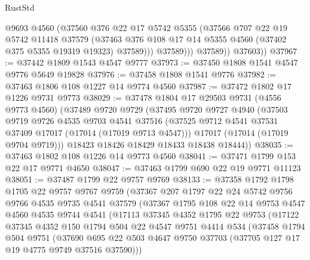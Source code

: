 \begin{lexlean}{RustStd}
\begin{coremodule}
                  @9693
                  @4560
                  (@37560
                    @376
                    @22
                    @17
                    @5742
                    @5355
                    (@37566
                      @707
                      @22
                      @19
                      @5742
                      @11418
                      @37579
                      (@37463
                        @376
                        @108
                        @17
                        @14
                        @5355
                        @4560
                        (@37402 @375 @5355 @19319 @19323)
                        @37589)))
                  @37589)))
            @37589))
        @37603))
@37967 := @37442 @1809 @1543 @4547 @9777
@37973 := @37450 @1808 @1541 @4547 @9776 @5649 @19828
@37976 := @37458 @1808 @1541 @9776
@37982 := @37463 @1806 @108 @1227 @14 @9774 @4560
@37987 := @37472 @1802 @17 @1226 @9731 @9773
@38029 := @37478
    @1804
    @17
    @29503
    @9731
    (@4556 @9773 @4560)
    (@37489
      @9720
      @9729
      (@37495
        @9720
        @9727
        @4940
        (@37503
          @9719
          @9726
          @4535
          @9703
          @4541
          @37516
          (@37525 @9712 @4541 @37531 @37409 @17017 (@17014 (@17019 @9713 @4547)))
          @17017
          (@17014 (@17019 @9704 @9719)))
        @18423
        @18426
        @18429
        @18433
        @18438
        @18444))
@38035 := @37463 @1802 @108 @1226 @14 @9773 @4560
@38041 := @37471 @1799 @153 @22 @17 @9771 @4650
@38047 := @37463 @1799 @690 @22 @19 @9771 @11123
@38051 := @37487 @1799 @22 @9757 @9769
@38133 := @37358
    @1792
    @1798
    @1705
    @22
    @9757
    @9767
    @9759
    (@37367
      @207
      @1797
      @22
      @24
      @5742
      @9756
      @9766
      @4535
      @9735
      @4541
      @37579
      (@37367
        @1795
        @108
        @22
        @14
        @9753
        @4547
        @4560
        @4535
        @9744
        @4541
        (@17113
          @37345
          @4352
          @1795
          @22
          @9753
          (@17122
            @37345
            @4352
            @150
            @1794
            @504
            @22
            @4547
            @9751
            @4414
            @534
            (@37458
              @1794
              @504
              @9751
              (@37690
                @695
                @22
                @503
                @4647
                @9750
                @37703
                (@37705 @127 @17 @19 @4775 @9749 @37516 @37590)))

\end{coremodule}
\end{lexlean}
